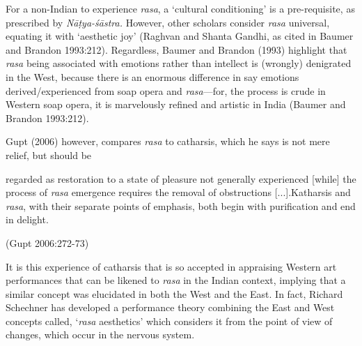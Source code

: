 
\vfill\eject

For a non-Indian to experience \textsl{rasa}, a ‘cultural conditioning’ is a pre-requisite, as prescribed by \textsl{Nāṭya-śāstra.} However, other scholars consider \textsl{rasa} universal, equating it with ‘aesthetic joy’ (Raghvan and Shanta Gandhi, as cited in Baumer and Brandon 1993:212).  Regardless, Baumer and Brandon (1993) highlight that \textsl{rasa} being associated with emotions rather than intellect is (wrongly) denigrated in the West, because there is an enormous difference in say emotions derived/experienced from soap opera and \textsl{rasa}---for, the process is crude in Western soap opera, it is marvelously refined and artistic in India (Baumer and Brandon 1993:212).

Gupt (2006) however, compares \textsl{rasa} to catharsis, which he says is not mere relief, but should be 

\begin{myquote}
regarded as restoration to a state of pleasure not generally experienced [while] the process of \textsl{rasa} emergence requires the removal of obstructions [...].Katharsis and \textsl{rasa}, with their separate points of emphasis, both begin with purification and end in delight. 

\hfill (Gupt 2006:272-73)
\end{myquote}

It is this experience of catharsis that is so accepted in appraising Western art performances that can be likened to \textsl{rasa} in the Indian context, implying that a similar concept was elucidated in both the West and the East. In fact, Richard Schechner has developed a performance theory combining the East and West concepts called, ‘\textsl{rasa} aesthetics’ which considers it from the point of view of changes, which occur in the nervous system. 

